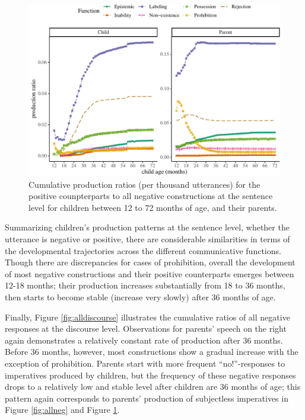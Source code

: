 \documentclass[
  man,floatsintext]{apa6}
\begin{document}
\begin{figure}[H]

{\centering \includegraphics{neg_construction_article_files/figure-latex/allpos-1} 

}

\caption{Cumulative production ratios (per thousand utterances) for the positive counpterparts to all negative constructions at the sentence level for children between 12 to 72 months of age, and their parents.}\label{fig:allpos}
\end{figure}

Summarizing children's production patterns at the sentence level, whether the utterance is negative or positive, there are considerable similarities in terms of the developmental trajectories across the different communicative functions. Though there are discrepancies for cases of prohibition, overall the development of most negative constructions and their positive counterparts emerges between 12-18 months; their production increases substantially from 18 to 36 months, then starts to become stable (increase very slowly) after 36 months of age.

Finally, Figure \ref{fig:alldiscourse} illustrates the cumulative ratios of all negative responses at the discourse level. Observations for parents' speech on the right again demonstrates a relatively constant rate of production after 36 months. Before 36 months, however, most constructions show a gradual increase with the exception of prohibition. Parents start with more frequent ``no!''-responses to imperatives produced by children, but the frequency of these negative responses drops to a relatively low and stable level after children are 36 months of age; this pattern again corresponds to parents' production of subjectless imperatives in Figure \ref{fig:allneg} and Figure \ref{fig:allpos}.
\end{document}
